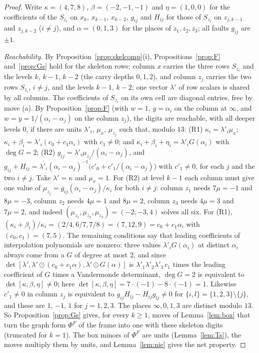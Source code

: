 \documentclass[11pt]{amsart}
\theoremstyle{definition}
\theoremstyle{plain}
\begin{document}
\begin{proof}
Write $\kappa=(4,7,8)$, $\beta=(-2,-1,-1)$ and $\eta=(1,0,0)$ for the coefficients of the $S_{z_i}$ on $x_k$, $x_{k-1}$, $x_{k-2}$, $g_{ij}$ and $H_{ij}$ for those of $S_{z_i}$ on $z_{j,k-1}$ and $z_{j,k-2}$ ($i\ne j$), and $\alpha=(0,1,3)$ for the places of $z_1,z_2,z_3$; all faults $g_{ij}$ are $\pm1$.

\emph{Reachability.} By Proposition~\ref{prop:skelcomp}(i), Propositions~\ref{prop:F} and~\ref{prop:Gs} hold for the skeleton rows: column $x$ carries the three rows $S_{z_i}$ and the levels $k$, $k-1$, $k-2$ (the carry depths $0,1,2$), and column $z_j$ carries the two rows $S_{z_i}$, $i\ne j$, and the levels $k-1$, $k-2$; one vector $\lambda'$ of row scalars is shared by all columns. The coefficients of $S_{z_i}$ on its own cell are diagonal entries, free by move (a). By Proposition~\ref{prop:F} (with $w=1$, $y=\alpha_i$ on the column at $\infty$, and $w=y=1/(\alpha_i-\alpha_j)$ on the column $z_j$), the digits are reachable, with all deeper levels $0$, if there are units $\lambda'_i$, $\mu_x$, $\mu_{z_j}$ such that, modulo $13$:
(R1) $\kappa_i=\lambda'_i\mu_x$; $\kappa_i+\beta_i=\lambda'_i(c_0+c_1\alpha_i)$ with $c_1\ne0$; and $\kappa_i+\beta_i+\eta_i=\lambda'_iG(\alpha_i)$ with $\deg G=2$;
(R2) $g_{ij}=\lambda'_i\mu_{z_j}/(\alpha_i-\alpha_j)$, and $g_{ij}+H_{ij}=\lambda'_i(\alpha_i-\alpha_j)^{-1}\bigl(c'_0+c'_1/(\alpha_i-\alpha_j)\bigr)$ with $c'_1\ne0$, for each $j$ and the two $i\ne j$.
Take $\lambda'=\kappa$ and $\mu_x=1$. For (R2) at level $k-1$ each column must give one value of $\mu_{z_j}=g_{ij}(\alpha_i-\alpha_j)/\kappa_i$ for both $i\ne j$: column $z_1$ needs $7\mu=-1$ and $8\mu=-3$, column $z_2$ needs $4\mu=1$ and $8\mu=2$, column $z_3$ needs $4\mu=3$ and $7\mu=2$, and indeed $(\mu_{z_1},\mu_{z_2},\mu_{z_3})=(-2,-3,4)$ solves all six. For (R1), $(\kappa_i+\beta_i)/\kappa_i=(2/4,6/7,7/8)=(7,12,9)=c_0+c_1\alpha_i$ with $(c_0,c_1)=(7,5)$. The remaining conditions say that leading coefficients of interpolation polynomials are nonzero: three values $\lambda'_iG(\alpha_i)$ at distinct $\alpha_i$ always come from a $G$ of degree at most $2$, and since $\det[\lambda',\lambda'\odot(c_0+c_1\alpha),\lambda'\odot G(\alpha)]$ is $\lambda'_1\lambda'_2\lambda'_3\,c_1$ times the leading coefficient of $G$ times a Vandermonde determinant, $\deg G=2$ is equivalent to $\det[\kappa,\beta,\eta]\ne0$; here $\det[\kappa,\beta,\eta]=7\cdot(-1)-8\cdot(-1)=1$. Likewise $c'_1\ne0$ in column $z_j$ is equivalent to $g_{ij}H_{lj}-H_{ij}g_{lj}\ne0$ for $\{i,l\}=\{1,2,3\}\setminus\{j\}$, and these are $1$, $-1$, $1$ for $j=1,2,3$. The places $\infty,0,1,3$ are distinct modulo $13$. So Proposition~\ref{prop:Gs} gives, for every $k\ge1$, moves of Lemma~\ref{lem:box} that turn the graph form $\Phi^F$ of the frame into one with these skeleton digits (truncated for $k=1$). The box minors of $\Phi^F$ are units (Lemma~\ref{lem:Ts}), the moves multiply them by units, and Lemma~\ref{lem:nie} gives the net property.


\end{proof}
\end{document}
